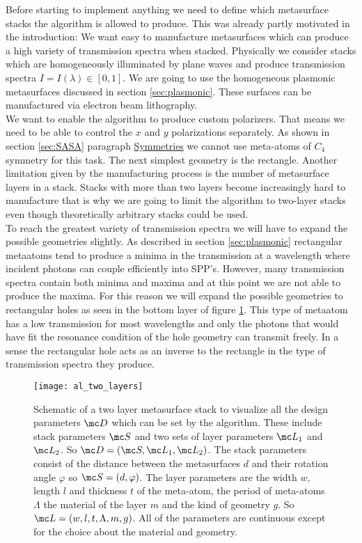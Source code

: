 Before starting to implement anything we need to define which metasurface stacks the algorithm is allowed to produce. This was already partly motivated in the introduction: We want easy to manufacture metasurfaces which can produce a high variety of transmission spectra when stacked.
Physically we consider stacks which are homogeneously illuminated by plane waves and produce transmission spectra $I = I(\lambda) \in [0,1]$.
We are going to use the homogeneous plasmonic metasurfaces discussed in section \ref{sec:plasmonic}. These surfaces can be manufactured via electron beam lithography.
\\

\indent
We want to enable the algorithm to produce custom polarizers. That means we need to be able to control the $x$ and $y$ polarizations separately. 
As shown in section \ref{sec:SASA} paragraph \hyperref[sec:symmetries]{Symmetries} we cannot use meta-atoms of $C_4$ symmetry for this task. The next simplest geometry is the rectangle. Another limitation given by the manufacturing process is the number of metasurface layers in a stack. Stacks with more than two layers become increasingly hard to manufacture that is why we are going to limit the algorithm to two-layer stacks even though theoretically arbitrary stacks could be used.
\\

\indent
To reach the greatest variety of transmission spectra we will have to expand the possible geometries slightly. As described in section \ref{sec:plasmonic} rectangular metaatoms tend to produce a minima in the transmission at a wavelength where incident photons can couple efficiently into SPP's. However, many transmission spectra contain both minima and maxima and at this point we are not able to produce the maxima. For this reason we will expand the possible geometries to rectangular holes as seen in the bottom layer of figure \ref{fig:al:two_layers}. This type of metaatom has a low transmission for most wavelengths and only the photons that would have fit the resonance condition of the hole geometry can transmit freely. In a sense the rectangular hole acts as an inverse to the rectangle in the type of transmission spectra they produce.


\begin{figure}[H]
    \centering
    \texttt{[image: al\_two\_layers]}
    \caption{Schematic of a two layer metasurface stack to visualize all the design parameters
    $\mc D$ which can be set by the algorithm. These include stack parameters $\mc S$ and two sets of layer parameters $\mc L_1$ and $\mc L_2$.
    So ${\mc D = (\mc S, \mc L_1, \mc L_2)}$. The stack parameters consist of the distance between the metasurfaces $d$ and their rotation angle $\varphi$ so $\mc S = (d, \varphi)$. The layer parameters are the width $w$, length $l$ and thickness $t$ of the meta-atom, the period of meta-atoms $\Lambda$ the  material of the layer $m$ and the kind of geometry $g$. So $\mc L = (w,l,t,\Lambda,m,g)$. All of the parameters are continuous except for the choice about the material and geometry.}
    \label{fig:al:two_layers}
\end{figure}



